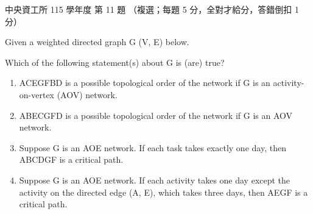 \begin{pastexam}[label={px:ncu-115-dsa-11}]{中央資工所 115 學年度 第 11 題}
（複選；每題 5 分，全對才給分，答錯倒扣 1 分）

Given a weighted directed graph G (V, E) below.
\begin{center}
\end{center}
Which of the following statement(s) about G is (are) true?
\begin{enumerate}[label=\Alph*.]
\item ACEGFBD is a possible topological order of the network if G is an activity-on-vertex (AOV) network.
\item ABECGFD is a possible topological order of the network if G is an AOV network.
\item Suppose G is an AOE network. If each task takes exactly one day, then ABCDGF is a critical path.
\item Suppose G is an AOE network. If each activity takes one day except the activity on the directed edge (A, E), which takes three days, then AEGF is a critical path.
\end{enumerate}
\end{pastexam}

